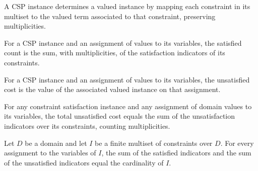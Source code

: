 \begin{definition}
\label{FABL.CSPInstance.toValuedInstance}
\leanok
{}
A CSP instance determines a valued instance by mapping each constraint in its multiset
to the valued term associated to that constraint, preserving multiplicities.
\end{definition}

\begin{definition}
\label{FABL.CSPInstance.satisfiedCount}
\leanok
{}
For a CSP instance and an assignment of values to its variables, the satisfied count is
the sum, with multiplicities, of the satisfaction indicators of its constraints.
\end{definition}

\begin{definition}
\label{FABL.CSPInstance.unsatisfiedCost}
\leanok
{}
For a CSP instance and an assignment of values to its variables, the unsatisfied cost is
the value of the associated valued instance on that assignment.
\end{definition}

\begin{theorem}
\label{FABL.CSPInstance.unsatisfiedCost_eq_sum}
\leanok
{}
For any constraint satisfaction instance and any assignment of domain values to its
variables, the total unsatisfied cost equals the sum of the unsatisfaction indicators
over its constraints, counting multiplicities.
\end{theorem}

\begin{theorem}
\label{FABL.CSPInstance.sum_indicators_eq_card}
\leanok
{}
Let $D$ be a domain and let $I$ be a finite multiset of constraints over $D$. For every assignment to the variables of $I$, the sum of the satisfied indicators and the sum of the unsatisfied indicators equal the cardinality of $I$.
\end{theorem}


